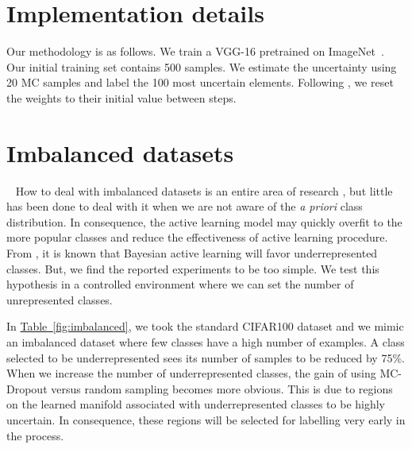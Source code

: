 \documentclass{article}
\newcommand{\tabref}[1]{\hyperref[#1]{Table\ \ref*{#1}}}
\begin{document}

\section{Implementation details}
Our methodology is as follows. We train a VGG-16 \citep{zhang2015accelerating} pretrained on ImageNet~\citep{imagenet_cvpr09}. Our initial training set contains 500 samples. We estimate the uncertainty using 20 MC samples and label the 100 most uncertain elements. Following \citet{gal2017deep}, we reset the weights to their initial value between steps. 

\section{Imbalanced datasets}
 
How to deal with imbalanced datasets is an entire area of research \citep{krawczyk2016learning}, but little has been done to deal with it when we are not aware of the \textit{a priori} class distribution. In consequence, the active learning model may quickly overfit to the more popular classes and reduce the effectiveness of active learning procedure. From \citet{gal2017deep}, it is known that Bayesian active learning will favor underrepresented classes. But, we find the reported experiments to be too simple. We  test this hypothesis in a controlled environment where we can set the number of unrepresented classes. 

In \tabref{fig:imbalanced}, we took the standard CIFAR100 dataset and we mimic an imbalanced dataset where few classes have a high number of examples. A class selected to be underrepresented sees its number of samples to be reduced by 75\%. When we increase the number of underrepresented classes, the gain of using MC-Dropout versus random sampling becomes more obvious. This is due to regions on the learned manifold associated with underrepresented classes to be highly uncertain. In consequence, these regions will be selected for labelling very early in the process.

\end{document}
